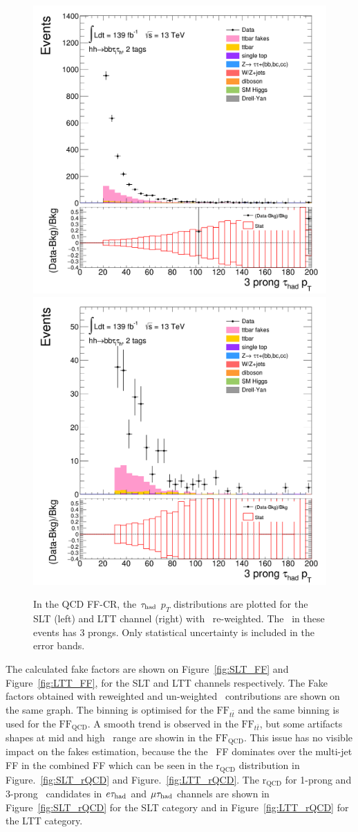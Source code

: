 \begin{figure}[htbp]
\centering
\includegraphics[width=.45\textwidth]{DiHiggs/plots/FF_CRs/InvCR_SLT/HNone/BDTVarsHighMbb/2/C_2tag2pjet_0ptv_TauPt3P.png}
\includegraphics[width=.45\textwidth]{DiHiggs/plots/FF_CRs/InvCR_LTT/HNone/BDTVarsHighMbb/2/C_2tag2pjet_0ptv_TauPt3P.png}\\
\caption{In the QCD FF-CR, the $\tau_{\mathrm{had}}$ $p_T$ distributions are plotted 
for the SLT (left) and LTT channel (right) 
with \ttbar\ re-weighted.
The \tauhad\ in these events has 3 prongs. 
Only statistical uncertainty is included in the error bands.}
\label{fig:InvCR_3}
\end{figure} 

\newpage
The calculated fake factors are shown on Figure~\ref{fig:SLT_FF} and Figure~\ref{fig:LTT_FF}, 
for the SLT and LTT channels respectively. 
The Fake factors obtained with reweighted and un-weighted \ttbar\ contributions are shown on the
same graph. 
The binning is optimised for the $\text{FF}_{t\bar{t}}$ and the same binning is used for the 
$\text{FF}_\text{QCD}$. A smooth trend is observed in the $\text{FF}_{t\bar{t}}$, 
but some artifacts shapes at mid and high \pt\ range are showin in the $\text{FF}_\text{QCD}$.
This issue has no visible impact on the fakes estimation, because the 
the \ttbar\ FF dominates over the multi-jet FF in the combined FF which can be seen 
in the $\mathrm{r}_\text{QCD}$ distribution in Figure.~\ref{fig:SLT_rQCD} and Figure.~\ref{fig:LTT_rQCD}. 
The  $\mathrm{r}_{\mathrm{QCD}}$ 
for 1-prong and 3-prong \tauhad\ candidates in $e\tau_{\mathrm{had}}$ and $\mu\tau_{\mathrm{had}}$ channels 
are shown in Figure~\ref{fig:SLT_rQCD} for the SLT category and 
in Figure~\ref{fig:LTT_rQCD} for the LTT category.



